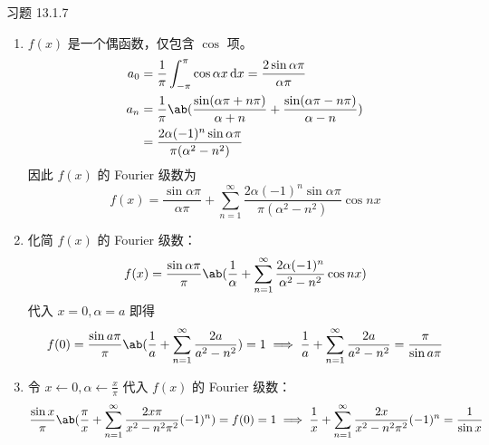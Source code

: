 \begin{problem}
    习题 13.1.7
    \begin{solution}
        \begin{enumerate}
            \item[\textbf{1)}] $f(x)$ 是一个偶函数，仅包含 $\cos$ 项。
            $$
            \begin{aligned}
                a_0 & = \frac{1}{\pi} \int_{-\pi}^{\pi} \cos \alpha x \dd{x} = \frac{2 \sin \alpha \pi}{\alpha \pi} \\
                a_n & = \frac{1}{\pi} \ab(\frac{\sin (\alpha \pi + n \pi)}{\alpha + n} + \frac{\sin (\alpha \pi - n \pi)}{\alpha - n}) \\
                & = \frac{2 \alpha (-1)^{n} \sin \alpha \pi}{\pi(\alpha^2 - n^2)}
            \end{aligned}
            $$
            因此 $f(x)$ 的 Fourier 级数为
            $$
            f(x) = \frac{\sin \alpha \pi}{\alpha \pi} + \sum_{n = 1}^{\infty} \frac{2 \alpha (-1)^{n} \sin \alpha \pi}{\pi(\alpha^2 - n^2)} \cos n x
            $$

            \item[\textbf{2)}] 化简 $f(x)$ 的 Fourier 级数：
            $$
            f(x) = \frac{\sin \alpha \pi}{\pi} \ab(\frac{1}{\alpha} + \sum_{n = 1}^{\infty} \frac{2 \alpha (-1)^{n}}{\alpha^2 - n^2} \cos n x)
            $$
            代入 $x = 0, \alpha = a$ 即得
            $$
            f(0) = \frac{\sin a \pi}{\pi} \ab(\frac{1}{a} + \sum_{n = 1}^{\infty} \frac{2 a}{a^2 - n^2}) = 1 \implies \frac{1}{a} + \sum_{n = 1}^{\infty} \frac{2 a}{a^2 - n^2} = \frac{\pi}{\sin a \pi}
            $$

            \item[\textbf{3)}] 令 $x \gets 0, \alpha \gets \frac{x}{\pi}$ 代入 $f(x)$ 的 Fourier 级数：
            $$
            \frac{\sin x}{\pi} \ab(\frac{\pi}{x} + \sum_{n = 1}^{\infty} \frac{2 x \pi}{x^2 - n^2 \pi^2} (-1)^{n}) = f(0) = 1 \implies \frac{1}{x} + \sum_{n = 1}^{\infty} \frac{2 x}{x^2 - n^2 \pi^2} (-1)^{n} = \frac{1}{\sin x}
            $$
        \end{enumerate}
    \end{solution}
\end{problem}